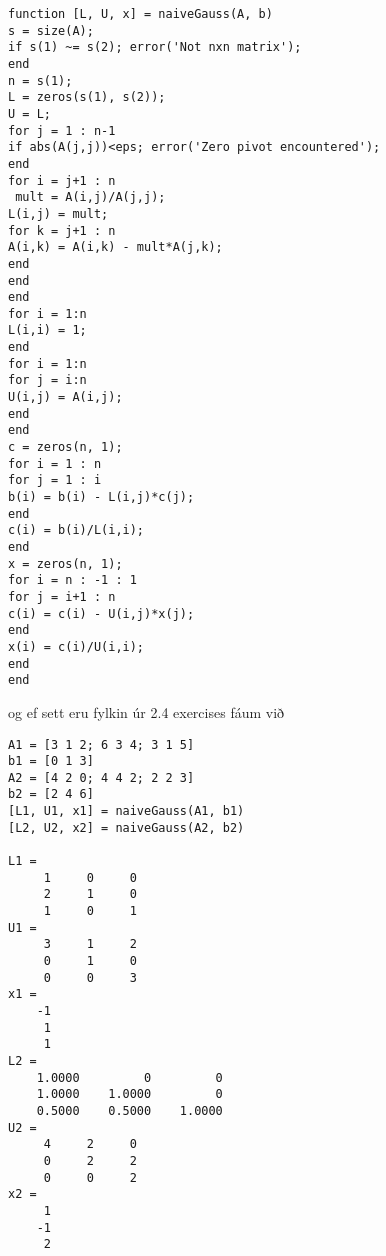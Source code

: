 \documentclass[11pt]{article}
\begin{document}
\begin{verbatim}
function [L, U, x] = naiveGauss(A, b)
s = size(A);
if s(1) ~= s(2); error('Not nxn matrix');
end
n = s(1);
L = zeros(s(1), s(2));
U = L;
for j = 1 : n-1
if abs(A(j,j))<eps; error('Zero pivot encountered'); 
end
for i = j+1 : n
 mult = A(i,j)/A(j,j);
L(i,j) = mult;
for k = j+1 : n
A(i,k) = A(i,k) - mult*A(j,k);
end
end
end
for i = 1:n
L(i,i) = 1;
end
for i = 1:n
for j = i:n
U(i,j) = A(i,j);
end
end
c = zeros(n, 1);
for i = 1 : n
for j = 1 : i
b(i) = b(i) - L(i,j)*c(j);
end
c(i) = b(i)/L(i,i);
end
x = zeros(n, 1);
for i = n : -1 : 1
for j = i+1 : n
c(i) = c(i) - U(i,j)*x(j);
end
x(i) = c(i)/U(i,i);
end
end
\end{verbatim}
og ef sett eru fylkin úr 2.4 exercises fáum við
\begin{verbatim}
A1 = [3 1 2; 6 3 4; 3 1 5]
b1 = [0 1 3]
A2 = [4 2 0; 4 4 2; 2 2 3]
b2 = [2 4 6]
[L1, U1, x1] = naiveGauss(A1, b1)
[L2, U2, x2] = naiveGauss(A2, b2)

L1 =
     1     0     0
     2     1     0
     1     0     1
U1 =
     3     1     2
     0     1     0
     0     0     3
x1 =
    -1
     1
     1
L2 =
    1.0000         0         0
    1.0000    1.0000         0
    0.5000    0.5000    1.0000
U2 =
     4     2     0
     0     2     2
     0     0     2
x2 =
     1
    -1
     2
\end{verbatim}
\end{document}
